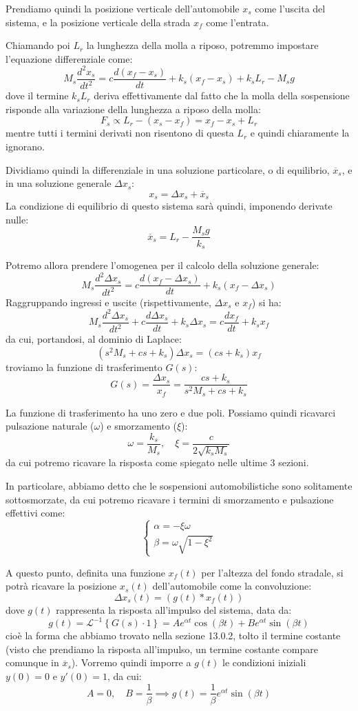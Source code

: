 \documentclass[a4paper,11pt]{article}
\begin{document}
\par\medskip

Prendiamo quindi la posizione verticale dell'automobile $x_s$ come l'uscita del sistema, e la posizione verticale della strada $x_f$ come l'entrata.

Chiamando poi $L_r$ la lunghezza della molla a riposo, potremmo impostare l'equazione differenziale come:
$$
M_s \frac{d^2 x_s}{dt^2} = c \frac{d ( x_f - x_s )}{dt} + k_s (x_f - x_s) + k_s L_r - M_s g
$$
dove il termine $k_s L_r$ deriva effettivamente dal fatto che la molla della sospensione risponde alla variazione della lunghezza a riposo della molla:
$$
F_s \propto  L_r - (x_s - x_f) = x_f - x_s + L_r
$$
mentre tutti i termini derivati non risentono di questa $L_r$ e quindi chiaramente la ignorano.

Dividiamo quindi la differenziale in una soluzione particolare, o di equilibrio, $\overline{x}_s$, e in una soluzione generale $\Delta x_s$:
$$
x_s = \Delta x_s + \overline{x}_s
$$
La condizione di equilibrio di questo sistema sarà quindi, imponendo derivate nulle:
$$
\overline{x}_s = L_r - \frac{M_s g}{k_s}
$$

Potremo allora prendere l'omogenea per il calcolo della soluzione generale:
$$
M_s \frac{d^2 \Delta x_s}{dt^2} = c \frac{d ( x_f - \Delta x_s )}{dt} + k_s (x_f - \Delta x_s)
$$
Raggruppando ingressi e uscite (rispettivamente, $\Delta x_s$ e $x_f$) si ha:
$$
M_s \frac{d^2 \Delta x_s}{dt^2} + c \frac{d \Delta x_s}{dt} + k_s \Delta x_s = c \frac{dx_f}{dt} + k_s x_f
$$
da cui, portandosi, al dominio di Laplace:
$$
\left( s^2 M_s + cs + k_s \right) \Delta x_s = ( cs + k_s ) x_f
$$
troviamo la funzione di trasferimento $G(s)$:
$$
G(s) = \frac{\Delta x_s}{x_f} = \frac{c s + k_s}{s^2 M_s + c s + k_s}
$$

La funzione di trasferimento ha uno zero e due poli.
Possiamo quindi ricavarci pulsazione naturale ($\omega$) e smorzamento ($\xi$):
$$
\omega = \frac{k_s}{M_s}, \quad \xi = \frac{c}{2 \sqrt{k_s M_s}}
$$
da cui potremo ricavare la risposta come spiegato nelle ultime 3 sezioni.

In particolare, abbiamo detto che le sospensioni automobilistiche sono solitamente sottosmorzate, da cui potremo ricavare i termini di smorzamento e pulsazione effettivi come:
\[
	\begin{cases}
		\alpha = -\xi \omega\\
		\beta = \omega \sqrt{1 - \xi^2}
	\end{cases}
\]

A questo punto, definita una funzione $x_f(t)$ per l'altezza del fondo stradale, si potrà ricavare la posizione $x_s(t)$ dell'automobile come la convoluzione:
$$
\Delta x_s(t) = ( g(t) * x_f(t) )
$$
dove $g(t)$ rappresenta la risposta all'impulso del sistema, data da:
$$
g(t) = \mathcal{L}^{-1} \left\{ G(s) \cdot 1 \right\} = A e^{\alpha t} \cos(\beta t) + B e^{\alpha t} \sin(\beta t)
$$
cioè la forma che abbiamo trovato nella sezione 13.0.2, tolto il termine costante (visto che prendiamo la risposta all'impulso, un termine costante compare comunque in $\overline{x}_s$).
Vorremo quindi imporre a $g(t)$ le condizioni iniziali $y(0) = 0$ e $y'(0) = 1$, da cui:
$$
A = 0, \quad B = \frac{1}{\beta}
\implies
g(t) = \frac{1}{\beta} e^{\alpha t} \sin(\beta t)
$$
\end{document}
